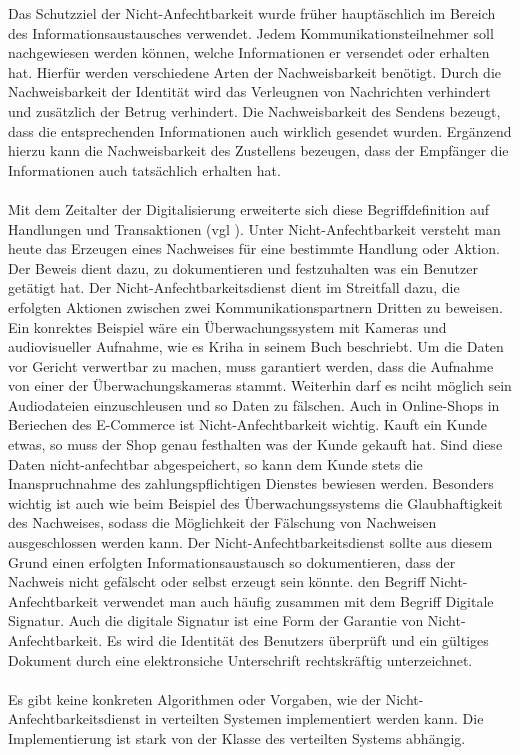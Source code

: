 \documentclass[utf8,biblatex]{lni}
\begin{document}
Das Schutzziel der Nicht-Anfechtbarkeit wurde früher hauptäschlich im Bereich des Informationsaustausches verwendet. Jedem Kommunikationsteilnehmer soll nachgewiesen werden können, welche Informationen er 
versendet oder erhalten hat. Hierfür werden verschiedene Arten der Nachweisbarkeit benötigt. Durch die Nachweisbarkeit der Identität wird das Verleugnen von Nachrichten verhindert und zusätzlich der Betrug verhindert.
Die Nachweisbarkeit des Sendens bezeugt, dass die entsprechenden Informationen auch wirklich gesendet wurden. Ergänzend hierzu kann die Nachweisbarkeit des Zustellens bezeugen, dass der Empfänger die Informationen
auch tatsächlich erhalten hat. \citet{Bedner.2010}
\\\\
Mit dem Zeitalter der Digitalisierung erweiterte sich diese Begriffdefinition auf Handlungen und Transaktionen (vgl \citet{Bedner.2010}).
Unter Nicht-Anfechtbarkeit versteht man heute das Erzeugen eines Nachweises für eine bestimmte Handlung oder Aktion. Der Beweis dient dazu, zu dokumentieren und festzuhalten was ein Benutzer getätigt hat. 
Der Nicht-Anfechtbarkeitsdienst
dient im Streitfall dazu, die erfolgten Aktionen zwischen zwei Kommunikationspartnern Dritten zu beweisen.
Ein konrektes Beispiel wäre ein Überwachungssystem mit Kameras und audiovisueller Aufnahme, wie es Kriha in seinem Buch \citet{Kriha.2008} beschriebt. Um die Daten vor Gericht verwertbar zu machen, muss garantiert werden, dass die Aufnahme von einer der Überwachungskameras stammt.
Weiterhin darf es nciht möglich sein Audiodateien einzuschleusen und so Daten zu fälschen. Auch in Online-Shops in Beriechen des E-Commerce ist Nicht-Anfechtbarkeit wichtig.
Kauft ein Kunde etwas, so muss der Shop genau festhalten was der Kunde gekauft hat. Sind diese Daten nicht-anfechtbar abgespeichert, so kann dem Kunde stets die Inanspruchnahme des zahlungspflichtigen Dienstes
bewiesen werden. Besonders wichtig ist auch wie beim Beispiel des Überwachungssystems die Glaubhaftigkeit des Nachweises, sodass die Möglichkeit der Fälschung von Nachweisen ausgeschlossen werden kann.
Der Nicht-Anfechtbarkeitsdienst sollte aus diesem Grund einen erfolgten Informationsaustausch so dokumentieren, dass der Nachweis nicht gefälscht oder selbst erzeugt sein könnte. 
den Begriff Nicht-Anfechtbarkeit verwendet man auch häufig zusammen mit dem Begriff \glqq Digitale Signatur\grqq{}. Auch die digitale Signatur ist eine Form der Garantie von Nicht-Anfechtbarkeit. 
Es wird die Identität des Benutzers überprüft und ein gültiges Dokument durch eine elektronsiche Unterschrift rechtskräftig unterzeichnet.
\\\\
Es gibt keine konkreten Algorithmen oder Vorgaben, wie der Nicht-Anfechtbarkeitsdienst in verteilten Systemen implementiert werden kann.
Die Implementierung ist stark von der Klasse des verteilten Systems abhängig.
\end{document}
